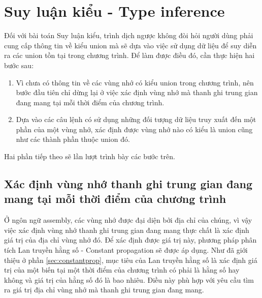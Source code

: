 \chapter{Suy luận kiểu - Type inference}

Đối với bài toán Suy luận kiểu, trình dịch ngược không đòi hỏi người dùng phải cung cấp thông tin về kiểu union mà sẽ dựa vào việc sử dụng dữ liệu để suy diễn ra các union tồn tại trong chương trình. Để làm được điều đó, cần thực hiện hai bước sau:

\begin{enumerate}
	\item Vì chưa có thông tin về các vùng nhớ có kiểu union trong chương trình, nên bước đầu tiên chỉ dừng lại ở việc xác định vùng nhớ mà thanh ghi trung gian đang mang tại mỗi thời điểm của chương trình.
	\item Dựa vào các câu lệnh có sử dụng những đối tượng dữ liệu truy xuất đến một phần của một vùng nhớ, xác định được vùng nhớ nào có kiểu là union cũng như các thành phần thuộc union đó.
\end{enumerate}

Hai phần tiếp theo sẽ lần lượt trình bày các bước trên.

\section{Xác định vùng nhớ thanh ghi trung gian đang mang tại mỗi thời điểm của chương trình}

Ở ngôn ngữ assembly, các vùng nhớ được đại diện bởi địa chỉ của chúng, vì vậy việc xác định vùng nhớ thanh ghi trung gian đang mang thực chất là xác định giá trị của địa chỉ vùng nhớ đó. Để xác định được giá trị này, phương pháp phân tích Lan truyền hằng số - Constant propagation sẽ được áp dụng. Như đã giới thiệu ở phần \ref{sec:constantprop}, mục tiêu của Lan truyền hằng số là xác định giá trị của một biến tại một thời điểm của chương trình có phải là hằng số hay không và giá trị của hằng số đó là bao nhiêu. Điều này phù hợp với yêu cầu tìm ra giá trị địa chỉ vùng nhớ mà thanh ghi trung gian đang mang.

